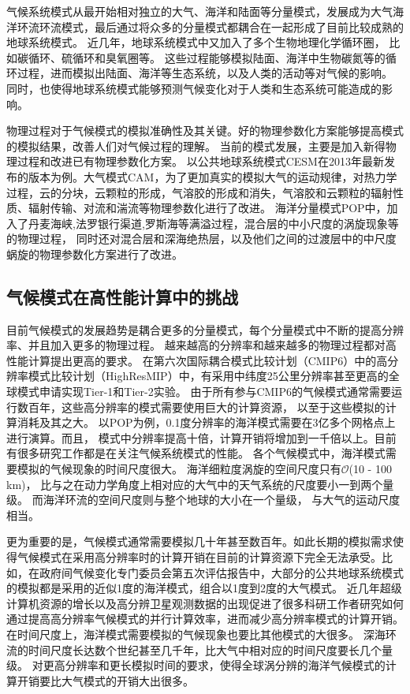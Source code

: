 气候系统模式从最开始相对独立的大气、海洋和陆面等分量模式，发展成为大气海洋环流环流模式，最后通过将众多的分量模式都耦合在一起形成了目前比较成熟的地球系统模式。
近几年，地球系统模式中又加入了多个生物地理化学循环圈， 比如碳循环、硫循环和臭氧圈等。
这些过程能够模拟陆面、海洋中生物碳氮等的循环过程，进而模拟出陆面、海洋等生态系统，以及人类的活动等对气候的影响。
同时，也使得地球系统模式能够预测气候变化对于人类和生态系统可能造成的影响。



物理过程对于气候模式的模拟准确性及其关键。好的物理参数化方案能够提高模式的模拟结果，改善人们对气候过程的理解。 
当前的模式发展，主要是加入新得物理过程和改进已有物理参数化方案。 
以公共地球系统模式CESM在2013年最新发布的版本\cite{hurrell2013community}为例。大气模式CAM，为了更加真实的模拟大气的运动规律，对热力学过程，云的分块，云颗粒的形成，气溶胶的形成和消失，气溶胶和云颗粒的辐射性质、辐射传输、对流和湍流等物理参数化进行了改进。
海洋分量模式POP中，加入了丹麦海峡,法罗银行渠道,罗斯海等满溢过程，混合层的中小尺度的涡旋现象等的物理过程， 同时还对混合层和深海绝热层，以及他们之间的过渡层中的中尺度蜗旋的物理参数化方案进行了改进。
 

\subsection{气候模式在高性能计算中的挑战}

目前气候模式的发展趋势是耦合更多的分量模式，每个分量模式中不断的提高分辨率、并且加入更多的物理过程。
越来越高的分辨率和越来越多的物理过程都对高性能计算提出更高的要求。 
在第六次国际耦合模式比较计划（CMIP6）中的高分辨率模式比较计划（HighResMIP）中，有采用中纬度25公里分辨率甚至更高的全球模式申请实现Tier-1和Tier-2实验。 
由于所有参与CMIP6的气候模式通常需要运行数百年，这些高分辨率的模式需要使用巨大的计算资源， 以至于这些模拟的计算消耗及其之大。
以POP为例，0.1度分辨率的海洋模式需要在3亿多个网格点上进行演算。而且，
模式中分辨率提高十倍，计算开销将增加到一千倍以上。目前有很多研究工作都是在关注气候系统模式的性能\cite{Worley:2011:PCE:2063384.2063457,dennis2012computational}。 
各个气候模式中，海洋模式需要模拟的气候现象的时间尺度很大。 
海洋细粒度涡旋的空间尺度只有$\mathcal{O}$(10 - 100 km)， 比与之在动力学角度上相对应的大气中的天气系统的尺度要小一到两个量级。
而海洋环流的空间尺度则与整个地球的大小在一个量级， 与大气的运动尺度相当。



更为重要的是，气候模式通常需要模拟几十年甚至数百年。如此长期的模拟需求使得气候模式在采用高分辨率时的计算开销在目前的计算资源下完全无法承受。比如，在政府间气候变化专门委员会第五次评估报告中，大部分的公共地球系统模式的模拟都是采用的近似1度的海洋模式，组合以1度到2度的大气模式。
近几年超级计算机资源的增长以及高分辨卫星观测数据的出现促进了很多科研工作者研究如何通过提高高分辨率气候模式的并行计算效率，进而减少高分辨率模式的计算开销。
在时间尺度上，海洋模式需要模拟的气候现象也要比其他模式的大很多。 深海环流的时间尺度长达数个世纪甚至几千年，比大气中相对应的时间尺度要长几个量级。
对更高分辨率和更长模拟时间的要求，使得全球涡分辨的海洋气候模式的计算开销要比大气模式的开销大出很多\cite{bryan2010frontal,mcclean2011prototype,graham2014importance}。

